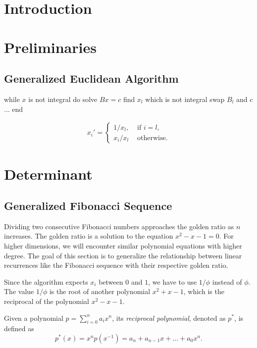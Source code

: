 \documentclass[english,version-2020-11]{uzl-thesis}
\begin{document}
\chapter{Introduction}

\chapter{Preliminaries}

\section{Generalized Euclidean Algorithm}

\begin{Pseudocode}
while $x$ is not integral do
  solve $Bx = c$
  find $x_l$ which is not integral
  swap $B_l$ and $c$
  ...
end
\end{Pseudocode}

\begin{align*}
  x_i' = \begin{cases}
    1 / x_l, & \text{ if } i = l, \\
    x_i / x_l & \text{ otherwise.}
  \end{cases}
\end{align*}

\chapter{Determinant}

\section{Generalized Fibonacci Sequence}

Dividing two consecutive Fibonacci numbers approaches the golden ratio as $n$ increases.
The golden ratio is a solution to the equation $x^2 - x - 1 = 0$.
For higher dimensions, we will encounter similar polynomial equations with higher degree.
The goal of this section is to generalize the relationship between linear
recurrences like the Fibonacci sequence with their respective golden ratio.

Since the algorithm expects $x_i$ between $0$ and $1$, we have to use $1/\phi$ instead of $\phi$.
The value $1/\phi$ is the root of another polynomial $x^2 + x - 1$, which is the reciprocal
of the polynomial $x^2 - x - 1$.

\begin{definition}
  Given a polynomial $p = \sum_{i=0}^n a_i x^n$, its \emph{reciprocal polynomial},
  denoted as $p^*$, is defined as
  \[
    p^*(x) = x^n p(x^{-1}) = a_n + a_{n-1} x + \dots + a_0 x^n.
  \]
\end{definition}
\end{document}
